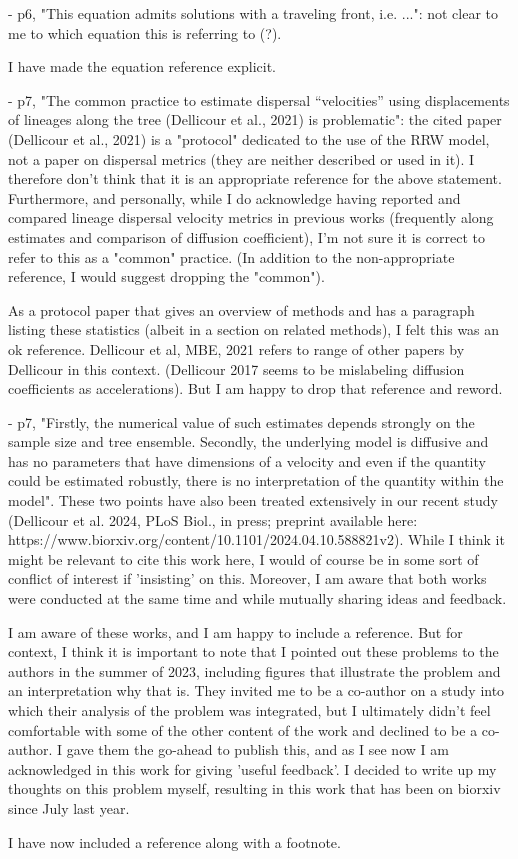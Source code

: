 \documentclass[11pt, oneside]{article}   	%
\newcommand{\response}[1]{{\color{black}{\bf Response:} #1}}
\begin{document}
- p6, "This equation admits solutions with a traveling front, i.e. ...": not clear to me to which equation this is referring to (?).

\response{I have made the equation reference explicit.}

- p7, "The common practice to estimate dispersal “velocities” using displacements of lineages along the tree (Dellicour et al., 2021) is problematic": the cited paper (Dellicour et al., 2021) is a "protocol" dedicated to the use of the RRW model, not a paper on dispersal metrics (they are neither described or used in it). I therefore don't think that it is an appropriate reference for the above statement. Furthermore, and personally, while I do acknowledge having reported and compared lineage dispersal velocity metrics in previous works (frequently along estimates and comparison of diffusion coefficient), I'm not sure it is correct to refer to this as a "common" practice. (In addition to the non-appropriate reference, I would suggest dropping the "common").

\response{As a protocol paper that gives an overview of methods and has a paragraph listing these statistics (albeit in a section on related methods), I felt this was an ok reference. Dellicour et al, MBE, 2021 refers to range of other papers by Dellicour in this context. (Dellicour 2017 seems to be mislabeling diffusion coefficients as accelerations). But I am happy to drop that reference and reword. }


- p7, "Firstly, the numerical value of such estimates depends strongly on the sample size and tree ensemble. Secondly, the underlying model is diffusive and has no parameters that have dimensions of a velocity and even if the quantity could be estimated robustly, there is no interpretation of the quantity within the model". These two points have also been treated extensively in our recent study (Dellicour et al. 2024, PLoS Biol., in press; preprint available here: https://www.biorxiv.org/content/10.1101/2024.04.10.588821v2). While I think it might be relevant to cite this work here, I would of course be in some sort of conflict of interest if 'insisting' on this. Moreover, I am aware that both works were conducted at the same time and while mutually sharing ideas and feedback.

\response{I am aware of these works, and I am happy to include a reference. But for context, I think it is important to note that I pointed out these problems to the authors in the summer of 2023, including figures that illustrate the problem and an interpretation why that is. They invited me to be a co-author on a study into which their analysis of the problem was integrated, but I ultimately didn't feel comfortable with some of the other content of the work and declined to be a co-author. I gave them the go-ahead to publish this, and as I see now I am acknowledged in this work for giving 'useful feedback'. I decided to write up my thoughts on this problem myself, resulting in this work that has been on biorxiv since July last year.

I have now included a reference along with a footnote.}
\end{document}
